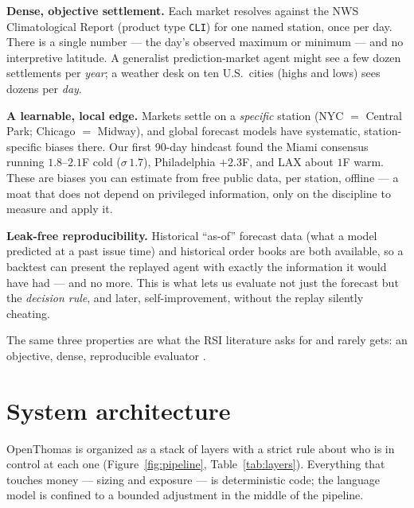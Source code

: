 \documentclass[10pt,twocolumn]{article}
\begin{document}
\textbf{Dense, objective settlement.} Each market resolves against the NWS
Climatological Report (product type \texttt{CLI}) for one named station, once per
day. There is a single number --- the day's observed maximum or minimum --- and no
interpretive latitude. A generalist prediction-market agent might see a few
dozen settlements per \emph{year}; a weather desk on ten U.S.\ cities
(highs and lows) sees dozens per \emph{day}.

\textbf{A learnable, local edge.} Markets settle on a \emph{specific} station
(NYC $=$ Central Park; Chicago $=$ Midway), and global forecast models have
systematic, station-specific biases there. Our first 90-day hindcast found the
Miami consensus running $1.8$--$2.1$\textdegree F cold ($\sigma\,1.7$),
Philadelphia $+2.3$\textdegree F, and LAX about $1$\textdegree F warm. These are
biases you can estimate from free public data, per station, offline --- a moat
that does not depend on privileged information, only on the discipline to
measure and apply it.

\textbf{Leak-free reproducibility.} Historical ``as-of'' forecast data (what a
model predicted at a past issue time) and historical order books are both
available, so a backtest can present the replayed agent with exactly the
information it would have had --- and no more. This is what lets us evaluate not
just the forecast but the \emph{decision rule}, and later, self-improvement,
without the replay silently cheating.

The same three properties are what the RSI literature asks for and rarely gets:
an objective, dense, reproducible evaluator \cite{harness}.

\section{System architecture}
\label{sec:arch}

OpenThomas is organized as a stack of layers with a strict rule about who is in
control at each one (Figure~\ref{fig:pipeline}, Table~\ref{tab:layers}).
Everything that touches money --- sizing and exposure --- is deterministic code;
the language model is confined to a bounded adjustment in the middle of the
pipeline.
\end{document}
